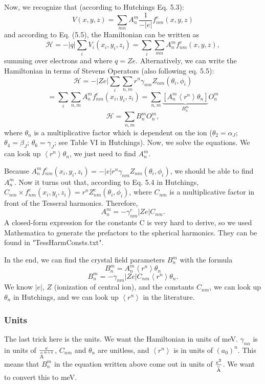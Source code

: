 \documentclass[twocolumn,english,prb]{revtex4-2}
\newcommand{\angstrom}{${\buildrel _{\circ} \over {\mathrm{A}}}$}
\begin{document}
Now, we recognize that (according to Hutchings Eq. 5.3): 
$$V(x,y,z)=\sum_{mn}A_{n}^{m}\frac{1}{-|e|}f_{nm}^{c}(x,y,z)$$
and according to Eq. (5.5), the Hamiltonian can be written as
$$
\mathcal{H}=-|q|\sum_{i}V_{i}(x_{i},y_{i},z_{i})=\sum_{i}\sum_{mn}A_{n}^{m}f_{nm}^{c}(x,y,z),
$$
summing over electrons and where $q=Ze$. Alternatively, we can write the Hamiltonian
in terms of Stevens Operators (also following eq. 5.5):
$$
\mathcal{H}=-|Ze|\sum_{i}\sum_{n,m}r^{n}\gamma_{nm}Z_{nm}(\theta_{i},\phi_{i})
$$
$$
=\sum_{i}\sum_{n,m}A_{n}^{m}f_{nm}^{c}(x_{i},y_{i},z_{i})=\sum_{n,m}\underbrace{\left[A_{n}^{m}\left\langle r^{n}\right\rangle \theta_{n}\right]}_{B_{n}^{m}}O_{n}^{m}
$$
$$ \mathcal{H} =\sum_{n,m} B_{n}^{m}O_{n}^{m}, $$
where $\theta_{n}$ is a multiplicative factor which is dependent
on the ion ($\theta_{2}=\alpha_{J}$; $\theta_{4}=\beta_{J}$; $\theta_{6}=\gamma_{J}$;
see Table VI in Hutchings). Now, we solve the equations. 
We can look up $\left\langle r^{n}\right\rangle \theta_{n}$,
we just need to find $A_{n}^{m}$.

Because $A_{n}^{m}f_{nm}^{c}(x_{i},y_{i},z_{i})=-|e|r^{n}\gamma_{nm}Z_{nm}(\theta_{i},\phi_{i})$,
we should be able to find $A_{n}^{m}$. Now it turns out that, according
to Eq. 5.4 in Hutchings, $C_{nm}\times f_{nm}^{c}(x_{i},y_{i},z_{i})=r^{n}Z_{nm}^{c}(\theta_{i},\phi_{i})$,
where $C_{nm}$ is a multiplicative factor in front of the Tesseral
harmonics. Therefore,
$$
A_{n}^{m}=-\gamma_{nm}^{c}|Ze|C_{nm}.
$$
A closed-form expression for the constants C is very hard to derive,
so we used Mathematica to generate the prefactors to the spherical
harmonics. They can be found in "TessHarmConsts.txt".



In the end, we can find the crystal field parameters $B_{n}^{m}$
with the formula
$$
B_{n}^{m}=A_{n}^{m}\left\langle r^{n}\right\rangle \theta_{n}
$$
\begin{equation}
B_{n}^{m}=-\gamma_{nm}|Ze|C_{nm}\left\langle r^{n}\right\rangle \theta_{n}.
\end{equation}
We know $|e|$, $Z$ (ionization of central ion), and the constants $C_{nm}$, we can look up $\theta_{n}$
in Hutchings, and we can look up $\left\langle r^{n}\right\rangle $
in the literature.


\subsubsection*{Units}
The last trick here is the units. We want the Hamiltonian in units of meV. $\gamma_{n\alpha}$ is in units of $\frac{e}{\textrm{\angstrom}^{n+1}}$,
$C_{nm}$ and $\theta_{n}$ are unitless, and $\left\langle r^{n}\right\rangle $
is in units of $(a_{0})^{n}$. This means that $B_{n}^{m}$ in the equation written above come out in units of $\frac{e^{2}}{\textrm{\angstrom}}$. We want to convert this to meV.
\end{document}
